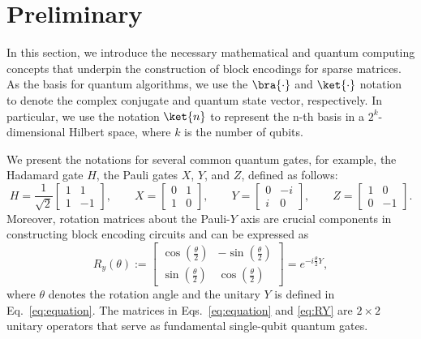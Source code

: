 \documentclass{article}
\begin{document}
\section{Preliminary}\label{sec:preliminary}
In this section, we introduce the necessary mathematical and quantum computing concepts that underpin the construction of block encodings for sparse matrices.
As the basis for quantum algorithms, we use the $\bra{\cdot}$ and $\ket{\cdot}$ notation to denote the complex conjugate and quantum state vector, respectively. In particular, we use the notation $\ket{n}$ to represent the n-th basis in a $2^k$-dimensional Hilbert space, where $k$ is the number of qubits.

We present the notations for several common quantum gates, for example, the Hadamard gate $H$, the Pauli gates $X$, $Y$, and $Z$, defined as follows:
\begin{equation}
  H = \frac{1}{\sqrt{2}}
  \begin{bmatrix}
    1 & 1  \\
    1 & -1
  \end{bmatrix}, \qquad
  X =
  \begin{bmatrix}
    0 & 1 \\
    1 & 0
  \end{bmatrix}, \qquad
  Y =
  \begin{bmatrix}
    0 & -i \\
    i & 0
  \end{bmatrix}, \qquad
  Z =
  \begin{bmatrix}
    1 & 0  \\
    0 & -1
  \end{bmatrix}.\label{eq:equation}
\end{equation}
Moreover, rotation matrices about the Pauli-$Y$ axis are crucial components in constructing block encoding circuits and can be expressed as
\begin{equation}
  R_y(\theta) :=
  \begin{bmatrix}
    \cos\left(\frac{\theta}{2}\right) & -\sin\left(\frac{\theta}{2}\right) \\
    \sin\left(\frac{\theta}{2}\right) & \cos\left(\frac{\theta}{2}\right)
  \end{bmatrix}
  = e^{-i \frac{\theta}{2} Y}, \label{eq:RY}
\end{equation}
where $\theta$ denotes the rotation angle and the unitary $Y$ is defined in Eq.~\eqref{eq:equation}. The matrices in Eqs.~\eqref{eq:equation} and \eqref{eq:RY} are $2 \times 2$ unitary operators that serve as fundamental single-qubit quantum gates.
\end{document}
